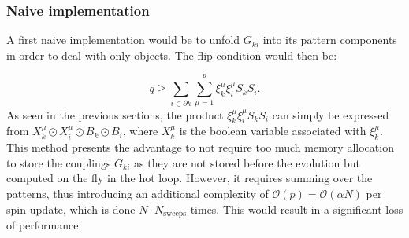 \subsubsection{Naive implementation}
A first naive implementation would be to unfold $G_{ki}$ into its pattern components in order to deal with \Bits only objects. The flip condition would then be:

\begin{equation}
 q\geq \sum_{i \in \partial k}\sum_{\mu=1}^{p}\xi_k^\mu \xi_i^\mu S_k S_i.
\end{equation}
As seen in the previous sections, the product $\xi_k^\mu \xi_i^\mu S_k S_i$ can simply be expressed from  $X_k^\mu \odot X_i^\mu \odot B_k \odot B_i$, where $X_k^\mu$ is the boolean variable associated with $\xi_k^\mu$. This method presents the advantage to not require too much memory allocation to store the couplings $G_{ki}$ as they are not stored before the evolution but computed on the fly in the hot loop.
However, it requires summing over the patterns, thus introducing  an additional complexity of $\mathcal{O}(p)=\mathcal{O}(\alpha N)$ per spin update, which is done $N \cdot N_\text{sweeps}$ times. This would result in a significant loss of performance.

